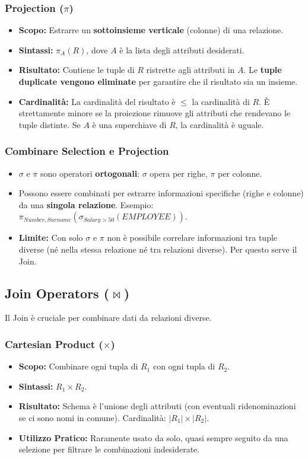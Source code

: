 \documentclass{article}
\newcommand{\selectop}[2]{\sigma_{#1}(#2)} %
\newcommand{\project}[2]{\pi_{#1}(#2)} %
\newcommand{\cartesian}{\times}
\newcommand{\naturaljoin}{\Join}
\begin{document}
	\subsubsection{Projection ($\pi$)}
	\begin{itemize}
		\item \textbf{Scopo:} Estrarre un \textbf{sottoinsieme verticale} (colonne) di una relazione.
		\item \textbf{Sintassi:} $\project{A}{R}$, dove $A$ è la lista degli attributi desiderati.
		\item \textbf{Risultato:} Contiene le tuple di $R$ ristrette agli attributi in $A$. Le \textbf{tuple duplicate vengono eliminate} per garantire che il risultato sia un insieme.
		\item \textbf{Cardinalità:} La cardinalità del risultato è $\leq$ la cardinalità di $R$. È strettamente minore se la proiezione rimuove gli attributi che rendevano le tuple distinte. Se $A$ è una superchiave di $R$, la cardinalità è uguale.
	\end{itemize}
	
	\subsubsection{Combinare Selection e Projection}
	\begin{itemize}
		\item $\sigma$ e $\pi$ sono operatori \textbf{ortogonali}: $\sigma$ opera per righe, $\pi$ per colonne.
		\item Possono essere combinati per estrarre informazioni specifiche (righe e colonne) da una \textbf{singola relazione}. Esempio: $\project{Number, Surname}{\selectop{Salary > 50}{EMPLOYEE}}$.
		\item \textbf{Limite:} Con solo $\sigma$ e $\pi$ non è possibile correlare informazioni tra tuple diverse (né nella stessa relazione né tra relazioni diverse). Per questo serve il Join.
	\end{itemize}
	
	\subsection{Join Operators ($\naturaljoin$)}
	
	Il Join è cruciale per combinare dati da relazioni diverse.
	
	\subsubsection{Cartesian Product ($\times$)}
	\begin{itemize}
		\item \textbf{Scopo:} Combinare ogni tupla di $R_1$ con ogni tupla di $R_2$.
		\item \textbf{Sintassi:} $R_1 \cartesian R_2$.
		\item \textbf{Risultato:} Schema è l'unione degli attributi (con eventuali ridenominazioni se ci sono nomi in comune). Cardinalità: $|R_1| \times |R_2|$.
		\item \textbf{Utilizzo Pratico:} Raramente usato da solo, quasi sempre seguito da una selezione per filtrare le combinazioni indesiderate.
	\end{itemize}
	
\end{document}
